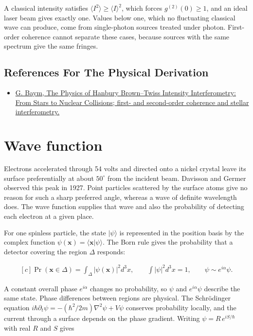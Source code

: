 \documentclass[11pt,oneside]{book}
\newenvironment{centeredalign}{\[\begin{gathered}[c]}{\end{gathered}\]}
\newcommand{\ket}[1]{\lvert #1\rangle}
\begin{document}
A classical intensity satisfies \(\langle I^2\rangle\geq\langle I\rangle^2\), which forces \(g^{(2)}(0)\geq1\), and an ideal laser beam gives exactly one. Values below one, which no fluctuating classical wave can produce, come from single-photon sources treated under photon. First-order coherence cannot separate these cases, because sources with the same spectrum give the same fringes.

\subsection*{References For The Physical Derivation}
\begin{itemize}
\item \href{https://arxiv.org/abs/nucl-th/9804026}{G. Baym, The Physics of Hanbury Brown--Twiss Intensity Interferometry: From Stars to Nuclear Collisions; first- and second-order coherence and stellar interferometry.}
\end{itemize}





\clearpage

\section{Wave function}

\label{topic:wave-function}

Electrons accelerated through 54 volts and directed onto a nickel crystal leave its surface preferentially at about \(50^\circ\) from the incident beam. Davisson and Germer observed this peak in 1927. Point particles scattered by the surface atoms give no reason for such a sharp preferred angle, whereas a wave of definite wavelength does. The wave function supplies that wave and also the probability of detecting each electron at a given place.

For one spinless particle, the state \(\ket\psi\) is represented in the position basis by the complex function \(\psi(\mathbf x)=\langle\mathbf x|\psi\rangle\). The Born rule gives the probability that a detector covering the region \(\Delta\) responds:

\begin{centeredalign}
\Pr(\mathbf x\in\Delta)=\int_\Delta|\psi(\mathbf x)|^2d^3x,\qquad
\int|\psi|^2d^3x=1,\qquad \psi\sim e^{i\alpha}\psi.
\end{centeredalign}

A constant overall phase \(e^{i\alpha}\) changes no probability, so \(\psi\) and \(e^{i\alpha}\psi\) describe the same state. Phase differences between regions are physical. The Schrödinger equation \(i\hbar\partial_t\psi=-(\hbar^2/2m)\nabla^2\psi+V\psi\) conserves probability locally, and the current through a surface depends on the phase gradient. Writing \(\psi=R\,e^{iS/\hbar}\) with real \(R\) and \(S\) gives
\end{document}
